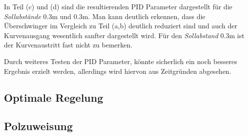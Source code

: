 In Teil (c) und (d) sind die resultierenden PID Parameter dargestellt für die
\textit{Sollabstände} $0.3\mathrm{m}$ und $0.3\mathrm{m}$. Man kann deutlich
erkennen, dass die Überschwinger im Vergleich zu Teil (a,b) deutlich reduziert
sind und auch der Kurvenausgang wesentlich sanfter dargestellt wird. Für den
\textit{Sollabstand} $0.3 \mathrm{m}$ ist der Kurvenaustritt fast nicht zu
bemerken.

Durch weiteres Testen der PID Parameter, könnte sicherlich ein noch besseres
Ergebnis erzielt werden, allerdings wird hiervon aus Zeitgründen abgesehen.
\subsection{Optimale Regelung}\label{subsec:optimale_regelung}

\subsection{Polzuweisung}\label{subsec:polzuweisung}
